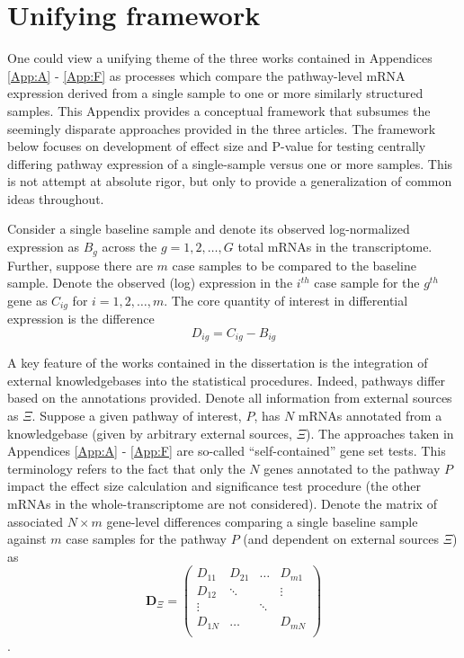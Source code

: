 \chapter{Unifying framework} \label{App:eqns}

\indent \indent One could view a unifying theme of the three works contained in Appendices \ref{App:A} - \ref{App:F} as processes which compare the pathway-level mRNA expression derived from a single sample to one or more similarly structured samples. This Appendix provides a conceptual framework that subsumes the seemingly disparate approaches provided in the three articles. The framework below focuses on  development of effect size and P-value for testing centrally differing pathway expression of a single-sample versus one or more samples. This is not attempt at absolute rigor, but only to provide a generalization of common ideas throughout.

Consider a single baseline sample and denote its observed log-normalized expression as $B_{g}$ across the $g=1,2,\ldots,G$ total mRNAs in the transcriptome. Further, suppose there are $m$ case samples to be compared to the baseline sample. Denote the observed (log) expression in the $i^{th}$ case sample for the $g^{th}$ gene as $C_{ig}$ for $i=1,2,\ldots,m$. The core quantity of interest in differential expression is the difference
\begin{equation*}
\label{eq:diff}
D_{ig}=C_{ig}-B_{ig}
\end{equation*}

A key feature of the works contained in the dissertation is the integration of external knowledgebases into the statistical procedures. Indeed, pathways differ based on the annotations provided. Denote all information from external sources as $\Xi$. Suppose a given pathway of interest, $P$, has $N$ mRNAs annotated from a knowledgebase (given by arbitrary external sources, $\Xi$). The approaches taken in Appendices \ref{App:A} - \ref{App:F} are so-called ``self-contained'' gene set tests. This terminology refers to the fact that only the $N$ genes annotated to the pathway $P$ impact the effect size calculation and significance test procedure (the other mRNAs in the whole-transcriptome are not considered). Denote the matrix of associated $N \times m$ gene-level differences comparing a single baseline sample against $m$ case samples for the pathway $P$ (and dependent on external sources $\Xi$) as
\begin{equation*}
  \label{eq:Dmat}
  \mathbf{D}_{\Xi} = \left ( \begin{array}{rcccc}
    D_{11} & D_{21} & \ldots & D_{m1} \\
    D_{12} & \ddots &  & \vdots \\
    \vdots &  & \ddots &  \\
    D_{1N} & \ldots &  & D_{mN} \\
\end{array} \right )
\end{equation*}.

